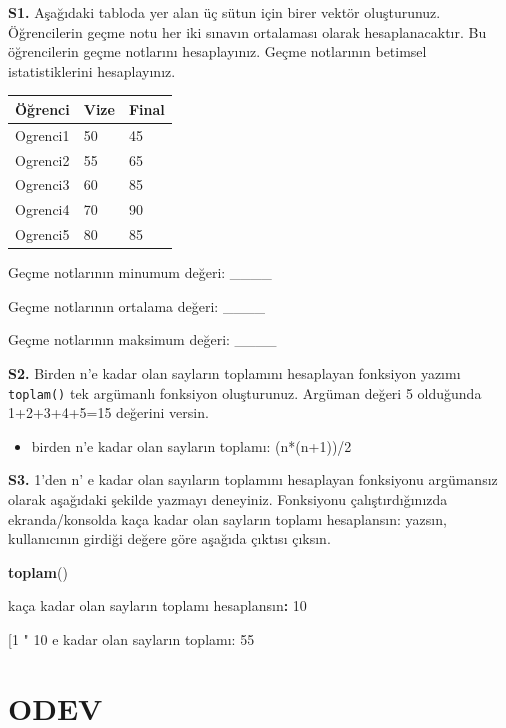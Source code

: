 \documentclass[
  oneside]{book}
\newenvironment{Shaded}{\begin{snugshade}}{\end{snugshade}}
\newcommand{\DecValTok}[1]{\textcolor[rgb]{0.00,0.00,0.81}{#1}}
\newcommand{\FunctionTok}[1]{\textcolor[rgb]{0.13,0.29,0.53}{\textbf{#1}}}
\newcommand{\NormalTok}[1]{#1}
\newcommand{\SpecialCharTok}[1]{\textcolor[rgb]{0.81,0.36,0.00}{\textbf{#1}}}
\newcommand{\StringTok}[1]{\textcolor[rgb]{0.31,0.60,0.02}{#1}}
\providecommand{\tightlist}{%
  \setlength{\itemsep}{0pt}\setlength{\parskip}{0pt}}
\begin{document}
\textbf{S1.} Aşağıdaki tabloda yer alan üç sütun için birer vektör oluşturunuz. Öğrencilerin geçme notu her iki sınavın ortalaması olarak hesaplanacaktır. Bu öğrencilerin geçme notlarını hesaplayınız. Geçme notlarının betimsel istatistiklerini hesaplayınız.

\begin{longtable}[]{@{}lll@{}}
\toprule\noalign{}
Öğrenci & Vize & Final \\
\midrule\noalign{}
\endhead
\bottomrule\noalign{}
\endlastfoot
Ogrenci1 & 50 & 45 \\
Ogrenci2 & 55 & 65 \\
Ogrenci3 & 60 & 85 \\
Ogrenci4 & 70 & 90 \\
Ogrenci5 & 80 & 85 \\
\end{longtable}

Geçme notlarının minumum değeri: \_\_\_\_

Geçme notlarının ortalama değeri: \_\_\_\_

Geçme notlarının maksimum değeri: \_\_\_\_

\textbf{S2.} Birden n'e kadar olan sayların toplamını hesaplayan fonksiyon yazımı \texttt{toplam()} tek argümanlı fonksiyon oluşturunuz. Argüman değeri 5 olduğunda 1+2+3+4+5=15 değerini versin.

\begin{itemize}
\tightlist
\item
  birden n'e kadar olan sayların toplamı: (n*(n+1))/2
\end{itemize}

\textbf{S3.} 1'den n' e kadar olan sayıların toplamını hesaplayan fonksiyonu argümansız olarak aşağıdaki şekilde yazmayı deneyiniz. Fonksiyonu çalıştırdığınızda ekranda/konsolda kaça kadar olan sayların toplamı hesaplansın: yazsın, kullanıcının girdiği değere göre aşağıda çıktısı çıksın.

\begin{Shaded}
\begin{Highlighting}[]
\FunctionTok{toplam}\NormalTok{()}

\NormalTok{kaça kadar olan sayların toplamı hesaplansın}\SpecialCharTok{:} \DecValTok{10}

\NormalTok{[}\DecValTok{1} \StringTok{" 10 \textquotesingle{}e kadar olan sayların toplamı: 55}
\end{Highlighting}
\end{Shaded}

\hypertarget{odev}{%
\section{\texorpdfstring{\textbf{ODEV}}{ODEV}}\label{odev}}
\end{document}
